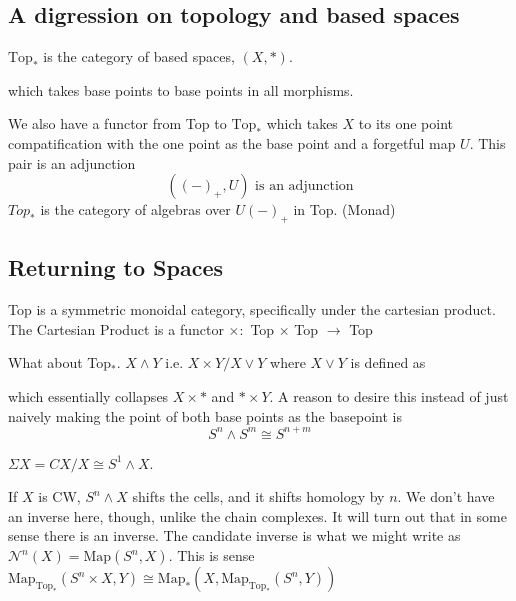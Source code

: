 \documentclass[10pt]{article}
\theoremstyle{definition}
\begin{document}
	\subsection{A digression on topology and based spaces}
	$\text{Top}_\ast$ is the category of based spaces, $(X,\ast)$. 
	\begin{center}
	\end{center}
	which takes base points to base points in all morphisms. 
	
	We also have a functor from Top to $\text{Top}_\ast$ which takes $X$ to its one point compatification with the one point as the base point and a forgetful map $U$. This pair is an adjunction\[
	((-)_+,U) \text{ is an adjunction} 
	\]
	$Top_*$ is the category of algebras over $U(-)_+$ in Top.  (Monad)
	
	\subsection{Returning to Spaces}
	Top is a symmetric monoidal category, specifically under the cartesian product. The Cartesian Product is a functor $\times:$ Top $\times$ Top $\to$ Top
	
	What about Top$_\ast$.  $X\wedge Y$ i.e. $X\times Y/X\vee Y$ where $X\vee Y$ is defined as \begin{center}
	\end{center}
	which essentially collapses $X\times \ast$ and $\ast\times Y$. A reason to desire this instead of just naively making the point of both base points as the basepoint is \[
	S^n\wedge S^m\cong S^{n+m}
	\]
	
	$\Sigma X=CX/X\cong S^1\wedge X$. 
	
	If $X$ is CW, $S^n\wedge X$ shifts the cells, and it shifts homology by $n$. We don't have an inverse here, though, unlike the chain complexes. It will turn out that in some sense there is an inverse. The candidate inverse is what we might write as $\mathcal{N}^n(X)=\text{Map}(S^n,X)$. This is sense $\text{Map}_{\text{Top}_\ast}(S^n\times X, Y)\cong \text{Map}_{\ast}(X,\text{Map}_{\text{Top}_\ast}(S^n,Y))$
\end{document}
